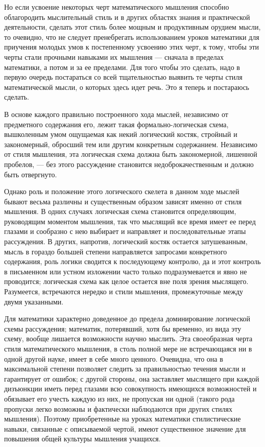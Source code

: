 \documentclass[12pt, a4paper, openany]{book}
\begin{document}
Но если усвоение некоторых черт математического мышления способно облагородить мыслительный стиль и в других областях знания и практической деятельности, сделать этот стиль более мощным и продуктивным орудием мысли, то очевидно, что не следует пренебрегать  использованием уроков математики для приучения молодых умов к постепенному усвоению этих черт, к тому, чтобы эти черты стали прочными навыками их мышления — сначала в пределах математики, а потом и за ее пределами. Для того чтобы это сделать, надо в первую очередь постараться со всей тщательностью выявить те черты стиля  математической мысли, о которых здесь идет речь. Это я теперь и постараюсь сделать. 

В основе каждого правильно построенного хода мыслей, независимо от предметного содержания его, лежит такая формально-логическая схема, вышколенным умом ощущаемая как некий логический костяк, стройный и  закономерный, обросший тем или другим конкретным  содержанием. Независимо от стиля мышления, эта логическая схема должна быть закономерной, лишенной пробелов, — без этого рассуждение становится недоброкачественным и должно быть отвергнуто. 

Однако роль и положение этого логического скелета в данном ходе мыслей бывают весьма различны и  существенным образом зависят именно от стиля мышления. В одних случаях логическая схема становится определяющим, руководящим моментом мышления, так что мыслящий все время имеет ее перед глазами и сообразно с нею выбирает и направляет и последовательные этапы рассуждения. В других, напротив, логический костяк остается  затушеванным, мысль в гораздо большей степени направляется запросами конкретного содержания, роль логики сводится к последующему контролю, да и этот контроль в  письменном или устном изложении часто только подразумевается и явно не проводится; логическая схема как целое остается вне поля зрения мыслящего. Разумеется, встречаются  нередко и стили мышления, промежуточные между двумя указанными. 

Для математики характерно доведенное до предела  доминирование логической схемы рассуждения; математик, потерявший, хотя бы временно, из вида эту схему, вообще лишается возможности научно мыслить. Эта своеобразная черта стиля математического мышления, в столь полной мере не встречающаяся ни в одной другой науке, имеет в себе много ценного. Очевидна, что она в максимальной степени позволяет следить за правильностью течения мысли и гарантирует от ошибок; с другой стороны, она  заставляет мыслящего при каждой дизъюнкции иметь перед  глазами всю совокупность имеющихся возможностей и  обязывает его учесть каждую из них, не пропуская ни одной (такого рода пропуски легко возможны и фактически  наблюдаются при других стилях мышления). Поэтому  приобретенные на уроках математики стилистические навыки, связанные с описываемой чертой, имеют существенное значение для повышения общей культуры мышления  учащихся. 
\end{document}
